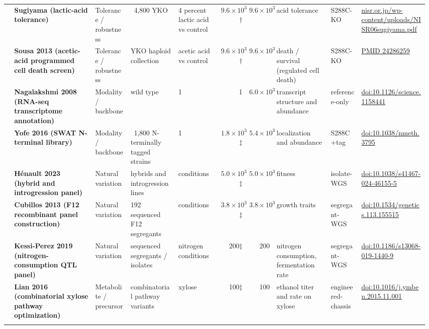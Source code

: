 \begin{landscape}
\begin{longtable}{@{}r@{\hspace{4pt}} L{42mm} L{21mm} L{26mm} L{20mm} r@{\hspace{5pt}} r@{\hspace{5pt}} L{30mm} L{23mm} L{34mm}@{}}
 & \textbf{Sugiyama (lactic-acid tolerance)} & Tolerance / robustness & ~4,800 YKO & 4 percent lactic acid vs control & $9.6\times 10^{3}$$\dagger$ & $9.6\times 10^{3}$ & acid tolerance & S288C-\allowbreak KO & \href{https://www.nisr.or.jp/wp-content/uploads/NISR06sugiyama.pdf}{nisr.or.jp/\allowbreak wp-content/\allowbreak uploads/\allowbreak NISR06sugiyama.pdf} \\
 & \textbf{Sousa 2013 (acetic-acid programmed cell death screen)} & Tolerance / robustness & YKO haploid collection & acetic acid vs control & $9.6\times 10^{3}$$\dagger$ & $9.6\times 10^{3}$ & death / survival (regulated cell death) & S288C-\allowbreak KO & \href{https://pubmed.ncbi.nlm.nih.gov/24286259/}{PMID 24286259} \\
 & \textbf{Nagalakshmi 2008 (RNA-seq transcriptome annotation)} & Modality / backbone & wild type & 1 & 1 & $6.0\times 10^{3}$ & transcript structure and abundance & reference-\allowbreak only & \href{https://doi.org/10.1126/science.1158441}{doi:10.1126/\allowbreak science.1158441} \\
 & \textbf{Yofe 2016 (SWAT N-terminal library)} & Modality / backbone & ~1,800 N-terminally tagged strains & 1 & $1.8\times 10^{3}$$\ddagger$ & $5.4\times 10^{3}$ & localization and abundance & S288C+\allowbreak tag & \href{https://doi.org/10.1038/nmeth.3795}{doi:10.1038/\allowbreak nmeth.3795} \\
 & \textbf{Hénault 2023 (hybrid and introgression panel)} & Natural variation & hybrids and introgression lines & conditions & $5.0\times 10^{3}$$\ddagger$ & $5.0\times 10^{3}$ & fitness & isolate-\allowbreak WGS & \href{https://doi.org/10.1038/s41467-024-46155-5}{doi:10.1038/\allowbreak s41467-024-46155-5} \\
 & \textbf{Cubillos 2013 (F12 recombinant panel construction)} & Natural variation & 192 sequenced F12 segregants & conditions & $3.8\times 10^{3}$$\ddagger$ & $3.8\times 10^{3}$ & growth traits & segregant-\allowbreak WGS & \href{https://doi.org/10.1534/genetics.113.155515}{doi:10.1534/\allowbreak genetics.113.155515} \\
 & \textbf{Kessi-Perez 2019 (nitrogen-consumption QTL panel)} & Natural variation & sequenced segregants / isolates & nitrogen conditions & 200$\ddagger$ & 200 & nitrogen consumption, fermentation rate & segregant-\allowbreak WGS & \href{https://doi.org/10.1186/s13068-019-1440-9}{doi:10.1186/\allowbreak s13068-019-1440-9} \\
 & \textbf{Lian 2016 (combinatorial xylose pathway optimization)} & Metabolite / precursor & combinatorial pathway variants & xylose & 100$\ddagger$ & 100 & ethanol titer and rate on xylose & engineered-\allowbreak chassis & \href{https://doi.org/10.1016/j.ymben.2015.11.001}{doi:10.1016/\allowbreak j.ymben.2015.11.001} \\
\addlinespace[5pt]
\end{longtable}
\endgroup
\end{landscape}
